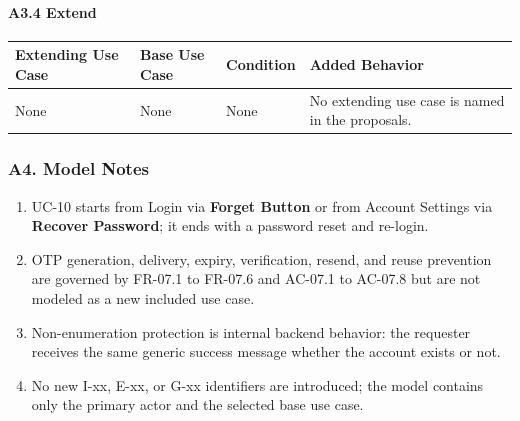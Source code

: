 \documentclass[12pt]{article}
\renewcommand{\baselinestretch}{1.5}
\begin{document}
\hypertarget{sec:a3-4-extend}{}
\paragraph*{A3.4 Extend}
\par\medskip

\begingroup
\small
\renewcommand{\baselinestretch}{1.0}\selectfont
\renewcommand{\arraystretch}{1.15}
\setlength{\tabcolsep}{6pt}
\begin{longtable}{|>{\raggedright\arraybackslash}p{}|>{\raggedright\arraybackslash}p{}|>{\raggedright\arraybackslash}p{}|>{\raggedright\arraybackslash}p{}|}
\hline
\textbf{Extending Use Case} & \textbf{Base Use Case} & \textbf{Condition} & \textbf{Added Behavior} \\ \hline
\endhead
None & None & None & No extending use case is named in the proposals. \\ \hline
\end{longtable}
\endgroup
\par\medskip

\hypertarget{sec:a4-model-notes}{}
\subsubsection*{A4. Model Notes}
\par\medskip

\begin{enumerate}
\item UC-10 starts from Login via \textbf{Forget Button} or from Account Settings via \textbf{Recover Password}; it ends with a password reset and re-login.
\item OTP generation, delivery, expiry, verification, resend, and reuse prevention are governed by FR-07.1 to FR-07.6 and AC-07.1 to AC-07.8 but are not modeled as a new included use case.
\item Non-enumeration protection is internal backend behavior: the requester receives the same generic success message whether the account exists or not.
\item No new I-xx, E-xx, or G-xx identifiers are introduced; the model contains only the primary actor and the selected base use case.
\end{enumerate}
\par\medskip

\hypertarget{sec:part-b-use-case-specification}{}
\end{document}
